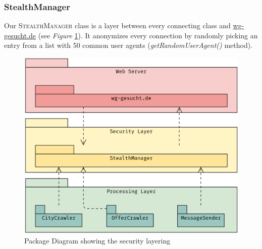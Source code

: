 \documentclass[11pt]{scrartcl}
\begin{document}
\subsubsection{StealthManager}
\begin{figure}[H]
        \centering
\end{figure}
Our \textsc{StealthManager} class is a layer between every connecting class and \url{wg-gesucht.de} (see \textit{Figure} \ref{fig:sec_lay}). It anonymizes every connection by randomly picking an entry from a list with 50 common user agents (\textit{getRandomUserAgent()} method). 
\begin{figure}
    \centering
    \includegraphics[width=\linewidth]{images/SecurityLayer.png}
    \caption{\UML Package Diagram showing the security layering}
    \label{fig:sec_lay}
\end{figure}%
\end{document}
